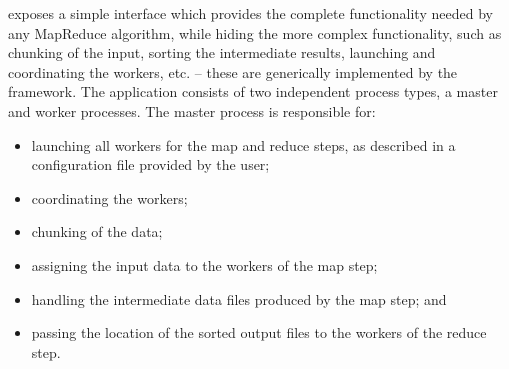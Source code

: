 \documentclass[3p,twocolumn]{elsarticle}
\begin{document}

\smr exposes a simple interface which provides the complete
functionality needed by any MapReduce algorithm, while hiding the more
complex functionality, such as chunking of the input, sorting the
intermediate results, launching and coordinating the workers, etc. --
these are generically implemented by the framework.  The application
consists of two independent process types, a master and worker processes.
The master process is responsible for:

\begin{itemize}
 \vspace*{-0.5em}
 \setlength{\itemsep}{-.1em}


 \item launching all workers for the map and reduce steps, as
 described in a configuration file provided by the user; 
 \item coordinating the workers;
 \item chunking of the data;
 \item assigning the
 input data to the workers of the map step;
 \item handling the intermediate
 data files produced by the map step; and
 \item passing the location of the
 sorted output files to the workers of the reduce step.


 \vspace*{-0.5em}
\end{itemize}
\end{document}
